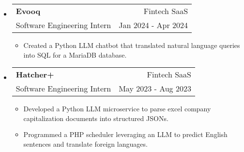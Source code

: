 \documentclass[letterpaper, 11pt]{article}
\makeatletter
\newcommand{\ResumeEntryTSDL}[4]{
  \vspace{1pt}\item
    \begin{tabular*}{\textwidth}[t]{l@{\extracolsep{\fill}}r} 
      \textbf{#1} & #2 \\
      #3 & #4 \\
    \end{tabular*}\vspace{-2.835pt} %
}
\newcommand{\ResumeItem}[2]{
  \item{
    \textbf{#1}{: #2 \vspace{-2.835pt}}
  }
}
\newcommand{\ResumeItemDefault}[1]{
  \item{
    #1 \vspace{-2.835pt}
  }
}
\newcommand{\ResumeEntryStart}{\begin{itemize}[leftmargin=0mm, label={}]}
\newcommand{\ResumeEntryEnd}{\end{itemize}\vspace{-2.835pt}} %
\newcommand{\ResumeItemListStart}{\begin{itemize}[leftmargin=5mm, label=$\bullet$, itemsep=1mm, parsep=1mm]} %
\newcommand{\ResumeItemListEnd}{\end{itemize}}
\makeatother
\begin{document}
  \ResumeEntryStart
    \ResumeEntryTSDL{Evooq}{Fintech SaaS}{Software Engineering Intern}{Jan 2024 - Apr 2024}
    \ResumeItemListStart

    \ResumeItemDefault{Created a Python LLM chatbot that translated natural language queries into SQL for a MariaDB database.}  
    \ResumeItemListEnd
  \ResumeEntryEnd

  \ResumeEntryStart
    \ResumeEntryTSDL{Hatcher+}{Fintech SaaS}{Software Engineering Intern}{May 2023 - Aug 2023}
    \ResumeItemListStart
      \ResumeItemDefault{Developed a Python LLM microservice to parse excel company capitalization documents into structured JSONs.}
      \ResumeItemDefault{Programmed a PHP scheduler leveraging an LLM to predict English sentences and translate foreign languages.}

    \ResumeItemListEnd
  \ResumeEntryEnd
\end{document}
